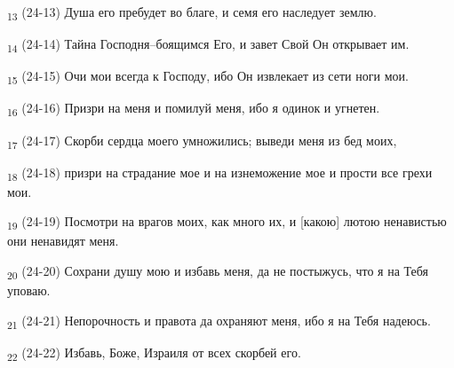 \begin{tcolorbox}
\textsubscript{13} (24-13) Душа его пребудет во благе, и семя его наследует землю.
\end{tcolorbox}
\begin{tcolorbox}
\textsubscript{14} (24-14) Тайна Господня--боящимся Его, и завет Свой Он открывает им.
\end{tcolorbox}
\begin{tcolorbox}
\textsubscript{15} (24-15) Очи мои всегда к Господу, ибо Он извлекает из сети ноги мои.
\end{tcolorbox}
\begin{tcolorbox}
\textsubscript{16} (24-16) Призри на меня и помилуй меня, ибо я одинок и угнетен.
\end{tcolorbox}
\begin{tcolorbox}
\textsubscript{17} (24-17) Скорби сердца моего умножились; выведи меня из бед моих,
\end{tcolorbox}
\begin{tcolorbox}
\textsubscript{18} (24-18) призри на страдание мое и на изнеможение мое и прости все грехи мои.
\end{tcolorbox}
\begin{tcolorbox}
\textsubscript{19} (24-19) Посмотри на врагов моих, как много их, и [какою] лютою ненавистью они ненавидят меня.
\end{tcolorbox}
\begin{tcolorbox}
\textsubscript{20} (24-20) Сохрани душу мою и избавь меня, да не постыжусь, что я на Тебя уповаю.
\end{tcolorbox}
\begin{tcolorbox}
\textsubscript{21} (24-21) Непорочность и правота да охраняют меня, ибо я на Тебя надеюсь.
\end{tcolorbox}
\begin{tcolorbox}
\textsubscript{22} (24-22) Избавь, Боже, Израиля от всех скорбей его.
\end{tcolorbox}
